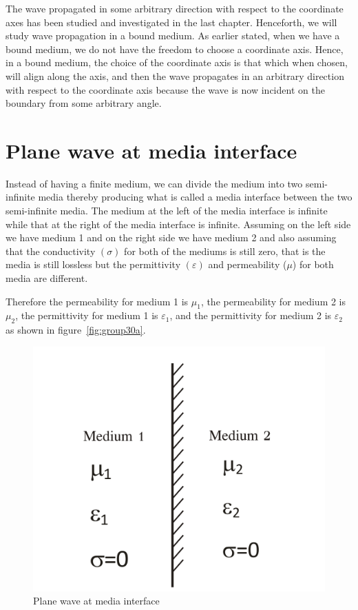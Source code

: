 The wave propagated in some arbitrary direction with respect to the coordinate axes has been studied and investigated in the last chapter. Henceforth, we will study wave propagation in a bound medium. As earlier stated, when we have a bound medium, we do not have the freedom to choose a coordinate axis. Hence, in a bound medium, the choice of the coordinate axis is that which when chosen, will align along the axis, and then the wave propagates in an arbitrary direction with respect to the coordinate axis because the wave is now incident on the boundary from some arbitrary angle.

\section{Plane wave at media interface}

Instead of having a finite medium, we can divide the medium into two semi-infinite media thereby producing what is called a media interface between the two semi-infinite media. The medium at the left of the media interface is infinite while that at the right of the media interface is infinite. Assuming on the left side we have medium 1 and on the right side we have medium 2 and also assuming that the conductivity $(\sigma)$ for both of the mediums is still zero, that is the media is still lossless but the permittivity $(\varepsilon)$ and permeability ($\mu$) for both media are different.

Therefore the permeability for medium 1 is $\mu_1$, the permeability for medium 2 is $\mu_2$, the permittivity for medium 1 is $\varepsilon_1$, and the permittivity for medium 2 is $\varepsilon_2$ as shown in figure~\ref{fig:group30a}.

\begin{figure}[h]
\centering
\includegraphics[width=.7\linewidth]{graphics/group30a}
\caption{Plane wave at media interface}
\label{fig:group30}
\end{figure}

